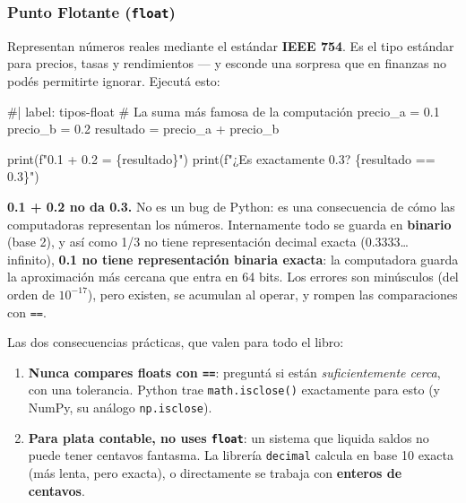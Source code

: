 \documentclass[
  spanish,
  letterpaper,
  DIV=11,
  numbers=noendperiod]{scrreprt}
\newenvironment{Shaded}{\begin{snugshade}}{\end{snugshade}}
\newcommand{\NormalTok}[1]{\textcolor[rgb]{0.00,0.23,0.31}{#1}}
\providecommand{\tightlist}{%
  \setlength{\itemsep}{0pt}\setlength{\parskip}{0pt}}
\begin{document}
\subsubsection{\texorpdfstring{Punto Flotante
(\texttt{float})}{Punto Flotante (float)}}\label{punto-flotante-float}

Representan números reales mediante el estándar \textbf{IEEE 754}. Es el
tipo estándar para precios, tasas y rendimientos --- y esconde una
sorpresa que en finanzas no podés permitirte ignorar. Ejecutá esto:

\begin{Shaded}
\begin{Highlighting}[]
\NormalTok{\#| label: tipos{-}float}
\NormalTok{\# La suma más famosa de la computación}
\NormalTok{precio\_a = 0.1}
\NormalTok{precio\_b = 0.2}
\NormalTok{resultado = precio\_a + precio\_b}

\NormalTok{print(f"0.1 + 0.2 = \{resultado\}")}
\NormalTok{print(f"¿Es exactamente 0.3? \{resultado == 0.3\}")}
\end{Highlighting}
\end{Shaded}

\textbf{0.1 + 0.2 no da 0.3.} No es un bug de Python: es una
consecuencia de cómo las computadoras representan los números.
Internamente todo se guarda en \textbf{binario} (base 2), y así como 1/3
no tiene representación decimal exacta (0.3333\ldots{} infinito),
\textbf{0.1 no tiene representación binaria exacta}: la computadora
guarda la aproximación más cercana que entra en 64 bits. Los errores son
minúsculos (del orden de \(10^{-17}\)), pero existen, se acumulan al
operar, y rompen las comparaciones con \texttt{==}.

Las dos consecuencias prácticas, que valen para todo el libro:

\begin{enumerate}
\def\labelenumi{\arabic{enumi}.}
\tightlist
\item
  \textbf{Nunca compares floats con \texttt{==}}: preguntá si están
  \emph{suficientemente cerca}, con una tolerancia. Python trae
  \texttt{math.isclose()} exactamente para esto (y NumPy, su análogo
  \texttt{np.isclose}).
\item
  \textbf{Para plata contable, no uses \texttt{float}}: un sistema que
  liquida saldos no puede tener centavos fantasma. La librería
  \texttt{decimal} calcula en base 10 exacta (más lenta, pero exacta), o
  directamente se trabaja con \textbf{enteros de centavos}.
\end{enumerate}
\end{document}
